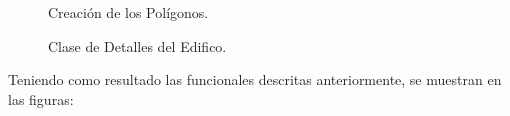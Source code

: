  \begin{figure}[h!]
	\begin{center}
		\caption{Creación de los Polígonos.}
		\label{poligono}
	\end{center}
\end{figure}
  \begin{figure}[h!]
 	\begin{center}
 		\caption{Clase de Detalles del Edifico.}
 		\label{detalleedificio}
 	\end{center}
 \end{figure}
 
 Teniendo como resultado las funcionales descritas anteriormente, se muestran en las figuras:
 
